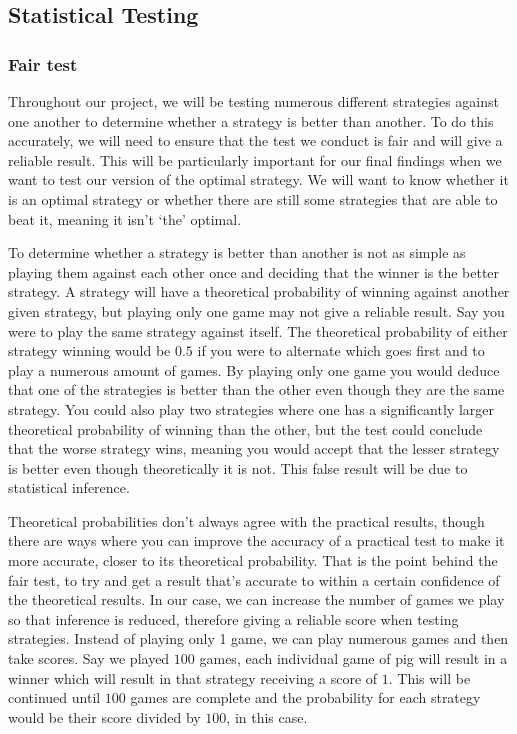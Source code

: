 \documentclass[a4paper,titlepage]{article}
\begin{document}
\subsection{Statistical Testing}
\subsubsection{Fair test}
Throughout our project, we will be testing numerous different strategies against one another to determine whether a strategy is better than another. To do this accurately, we will need to ensure that the test we conduct is fair and will give a reliable result. This will be particularly important for our final findings when we want to test our version of the optimal strategy. We will want to know whether it is an optimal strategy or whether there are still some strategies that are able to beat it, meaning it isn’t `the' optimal.

To determine whether a strategy is better than another is not as simple as playing them against each other once and deciding that the winner is the better strategy. A strategy will have a theoretical probability of winning against another given strategy, but playing only one game may not give a reliable result. Say you were to play the same strategy against itself. The theoretical probability of either strategy winning would be $0.5$ if you were to alternate which goes first and to play a numerous amount of games. By playing only one game you would deduce that one of the strategies is better than the other even though they are the same strategy. You could also play two strategies where one has a significantly larger theoretical probability of winning than the other, but the test could conclude that the worse strategy wins, meaning you would accept that the lesser strategy is better even though theoretically it is not. This false result will be due to statistical inference.

Theoretical probabilities don’t always agree with the practical results, though there are ways where you can improve the accuracy of a practical test to make it more accurate, closer to its theoretical probability. That is the point behind the fair test, to try and get a result that’s accurate to within a certain confidence of the theoretical results.  In our case, we can increase the number of games we play so that inference is reduced, therefore giving a reliable score when testing strategies. Instead of playing only 1 game, we can play numerous games and then take scores. Say we played $100$ games, each individual game of pig will result in a winner which will result in that strategy receiving a score of $1$. This will be continued until $100$ games are complete and the probability for each strategy would be their score divided by $100$, in this case.
\end{document}
